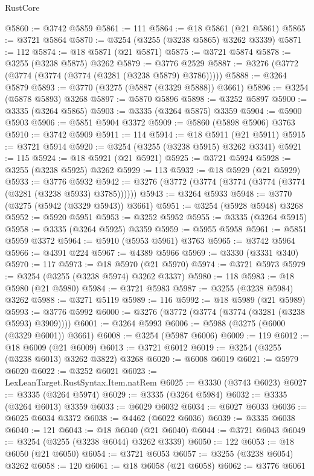 \begin{lexlean}{RustCore}
\begin{coremodule}
@5860 := @3742 @5859
@5861 := 111
@5864 := @18 @5861 (@21 @5861)
@5865 := @3721 @5864
@5870 := @3254 (@3255 (@3238 @5865) @3262 @3339)
@5871 := 112
@5874 := @18 @5871 (@21 @5871)
@5875 := @3721 @5874
@5878 := @3255 (@3238 @5875) @3262
@5879 := @3776 @2529
@5887 := @3276 (@3772 (@3774 (@3774 (@3774 (@3281 (@3238 @5879) @3786)))))
@5888 := @3264 @5879
@5893 := @3770 (@3275 (@5887 (@3329 @5888)) @3661)
@5896 := @3254 (@5878 @5893) @3268
@5897 := @5870 @5896
@5898 := @3252 @5897
@5900 := @3335 (@3264 @5865)
@5903 := @3335 (@3264 @5875) @3359
@5904 := @5900 @5903
@5906 := @5851 @5904 @3372
@5909 := @5860 (@5898 @5906) @3763
@5910 := @3742 @5909
@5911 := 114
@5914 := @18 @5911 (@21 @5911)
@5915 := @3721 @5914
@5920 := @3254 (@3255 (@3238 @5915) @3262 @3341)
@5921 := 115
@5924 := @18 @5921 (@21 @5921)
@5925 := @3721 @5924
@5928 := @3255 (@3238 @5925) @3262
@5929 := 113
@5932 := @18 @5929 (@21 @5929)
@5933 := @3776 @5932
@5942 := @3276 (@3772 (@3774 (@3774 (@3774 (@3774 (@3281 (@3238 @5933) @3785))))))
@5943 := @3264 @5933
@5948 := @3770 (@3275 (@5942 (@3329 @5943)) @3661)
@5951 := @3254 (@5928 @5948) @3268
@5952 := @5920 @5951
@5953 := @3252 @5952
@5955 := @3335 (@3264 @5915)
@5958 := @3335 (@3264 @5925) @3359
@5959 := @5955 @5958
@5961 := @5851 @5959 @3372
@5964 := @5910 (@5953 @5961) @3763
@5965 := @3742 @5964
@5966 := @4391 @224
@5967 := @4389 @5966
@5969 := @3330 (@3331 @340)
@5970 := 117
@5973 := @18 @5970 (@21 @5970)
@5974 := @3721 @5973
@5979 := @3254 (@3255 (@3238 @5974) @3262 @3337)
@5980 := 118
@5983 := @18 @5980 (@21 @5980)
@5984 := @3721 @5983
@5987 := @3255 (@3238 @5984) @3262
@5988 := @3271 @5119
@5989 := 116
@5992 := @18 @5989 (@21 @5989)
@5993 := @3776 @5992
@6000 := @3276 (@3772 (@3774 (@3774 (@3281 (@3238 @5993) @3909))))
@6001 := @3264 @5993
@6006 := @5988 (@3275 (@6000 (@3329 @6001)) @3661)
@6008 := @3254 (@5987 @6006)
@6009 := 119
@6012 := @18 @6009 (@21 @6009)
@6013 := @3721 @6012
@6019 := @3254 (@3255 (@3238 @6013) @3262 @3822) @3268
@6020 := @6008 @6019
@6021 := @5979 @6020
@6022 := @3252 @6021
@6023 := LexLeanTarget.RustSyntax.Item.natRem
@6025 := @3330 (@3743 @6023)
@6027 := @3335 (@3264 @5974)
@6029 := @3335 (@3264 @5984)
@6032 := @3335 (@3264 @6013) @3359
@6033 := @6029 @6032
@6034 := @6027 @6033
@6036 := @6025 @6034 @3372
@6038 := @4462 (@6022 @6036)
@6039 := @3335 @6038
@6040 := 121
@6043 := @18 @6040 (@21 @6040)
@6044 := @3721 @6043
@6049 := @3254 (@3255 (@3238 @6044) @3262 @3339)
@6050 := 122
@6053 := @18 @6050 (@21 @6050)
@6054 := @3721 @6053
@6057 := @3255 (@3238 @6054) @3262
@6058 := 120
@6061 := @18 @6058 (@21 @6058)
@6062 := @3776 @6061

\end{coremodule}
\end{lexlean}
